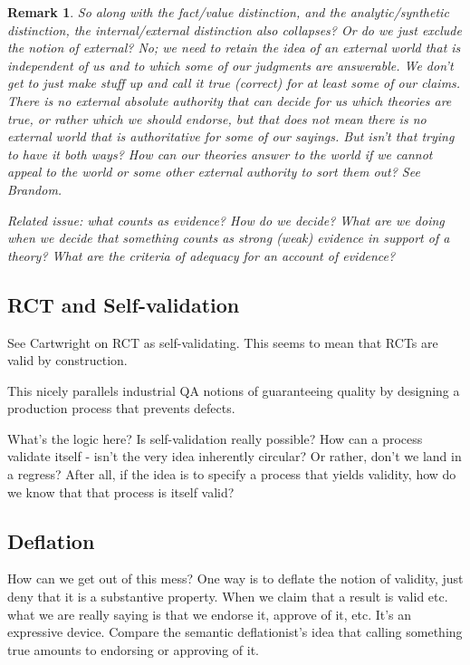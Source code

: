 \documentclass[11pt,twoside]{article}
\newtheorem{remark}{Remark}
\begin{document}
\begin{remark}
  So along with the fact/value distinction, and the analytic/synthetic
  distinction, the internal/external distinction also collapses?  Or
  do we just exclude the notion of external?  No; we need to retain
  the idea of an external world that is independent of us and to which
  some of our judgments are answerable.  We don't get to just make
  stuff up and call it true (correct) for at least some of our claims.
  There is no external absolute authority that can decide for us which
  theories are true, or rather which we should endorse, but that does
  not mean there is no external world that is authoritative for some
  of our sayings.  But isn't that trying to have it both ways?  How
  can our theories answer to the world if we cannot appeal to the
  world or some other external authority to sort them out?  See
  Brandom.

Related issue: what counts as evidence?  How do we decide?  What are
we doing when we decide that something counts as strong (weak)
evidence in support of a theory?  What are the criteria of adequacy
for an account of evidence?
\end{remark}

\subsection{RCT and Self-validation}

See Cartwright on RCT as self-validating.  This seems to mean that
RCTs are valid by construction.

This nicely parallels industrial QA notions of guaranteeing quality by
designing a production process that prevents defects.

What's the logic here?  Is self-validation really possible?  How can a
process validate itself - isn't the very idea inherently circular?  Or
rather, don't we land in a regress?  After all, if the idea is to
specify a process that yields validity, how do we know that that
process is itself valid?

\subsection{Deflation}

How can we get out of this mess?  One way is to deflate the notion of
validity, just deny that it is a substantive property.  When we claim
that a result is valid etc. what we are really saying is that we
endorse it, approve of it, etc.  It's an expressive device.  Compare
the semantic deflationist's idea that calling something true amounts
to endorsing or approving of it.
\end{document}
